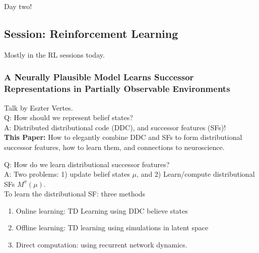 Day two! 

\subsection{Session: Reinforcement Learning}

Mostly in the RL sessions today.

\subsubsection{A Neurally Plausible Model Learns Successor Representations in Partially Observable Environments \cite{vertes2019neurally}}

Talk by Eszter Vertes. \\

Q: How should we represent belief states? \\

A:  Distributed distributional code (DDC), and successor features (SFs)! \\

{\bf This Paper:} How to elegantly combine DDC and SFs to form distributional successor features, how to learn them, and connections to neuroscience. \\




Q: How do we learn distributional successor features? \\

A: Two problems: 1) update belief states $\mu$, and 2) Learn/compute distributional SFs $M^{\pi}(\mu)$. \\

To learn the distributional SF: three methods
\begin{enumerate}
    \item Online learning: TD Learning using DDC believe states
    \item Offline learning: TD learning using simulations in latent space 
    \item Direct computation: using recurrent network dynamics.
\end{enumerate}

